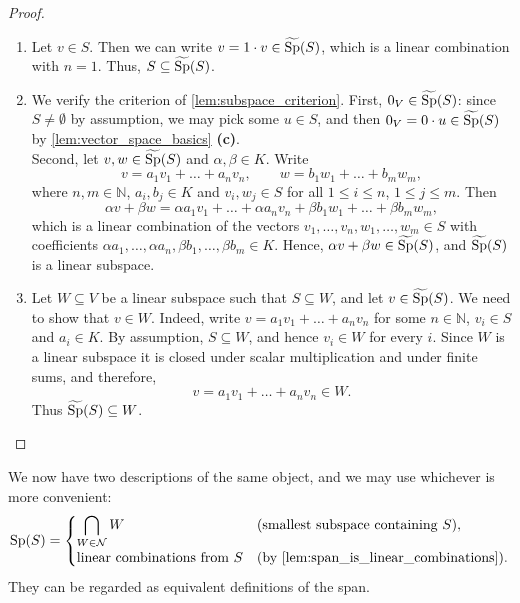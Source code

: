 \begin{proof}
\begin{enumerate}[label=\textbf{(\alph*)}]
    \item Let $v \in S$. Then we can write $v = 1 \cdot v \in \widetilde{\operatorname{Sp}}(S)$, which is a linear combination with $n = 1$. Thus, $S \subseteq \widetilde{\operatorname{Sp}}(S)$.

    \item We verify the criterion of \cref{lem:subspace_criterion}. First, $0_V \in \widetilde{\operatorname{Sp}}(S)$: since $S \ne \emptyset$ by assumption, we may pick some $u \in S$, and then $0_V = 0 \cdot u \in \widetilde{\operatorname{Sp}}(S)$ by \cref{lem:vector_space_basics} \textbf{(c)}. \\
    Second, let $v, w \in \widetilde{\operatorname{Sp}}(S)$ and $\alpha, \beta \in K$. Write
    \[
    v = a_1 v_1 + \dots + a_n v_n, \qquad w = b_1 w_1 + \dots + b_m w_m,
    \]
    where $n, m \in \mathbb{N}$, $a_i, b_j \in K$ and $v_i, w_j \in S$ for all $1 \le i \le n$, $1 \le j \le m$. Then
    \[
    \alpha v + \beta w = \alpha a_1 v_1 + \dots + \alpha a_n v_n + \beta b_1 w_1 + \dots + \beta b_m w_m,
    \]
    which is a linear combination of the vectors $v_1, \dots, v_n, w_1, \dots, w_m \in S$ with coefficients $\alpha a_1, \dots, \alpha a_n, \beta b_1, \dots, \beta b_m \in K$. Hence, $\alpha v + \beta w \in \widetilde{\operatorname{Sp}}(S)$, and $\widetilde{\operatorname{Sp}}(S)$ is a linear subspace.

    \item Let $W \subseteq V$ be a linear subspace such that $S \subseteq W$, and let $v \in \widetilde{\operatorname{Sp}}(S)$. We need to show that $v \in W$. Indeed, write $v = a_1 v_1 + \dots + a_n v_n$ for some $n \in \mathbb{N}$, $v_i \in S$ and $a_i \in K$. By assumption, $S \subseteq W$, and hence $v_i \in W$ for every $i$. Since $W$ is a linear subspace it is closed under scalar multiplication and under finite sums, and therefore,
    \[
    v = a_1 v_1 + \dots + a_n v_n \in W.
    \]
    Thus $\widetilde{\operatorname{Sp}}(S) \subseteq W$. \qedhere
\end{enumerate}
\end{proof}

\begin{summary}
\label{sum:two_definitions_of_span}
We now have two descriptions of the same object, and we may use whichever is more convenient:
\[
\Sp(S) =
\begin{cases}
\displaystyle \bigcap_{W \in \mathcal{N}} W & \text{(smallest subspace containing } S), \\[2ex]
\text{linear combinations from } S & \text{(by \cref{lem:span_is_linear_combinations}).}
\end{cases}
\]
They can be regarded as equivalent definitions of the span.
\end{summary}

